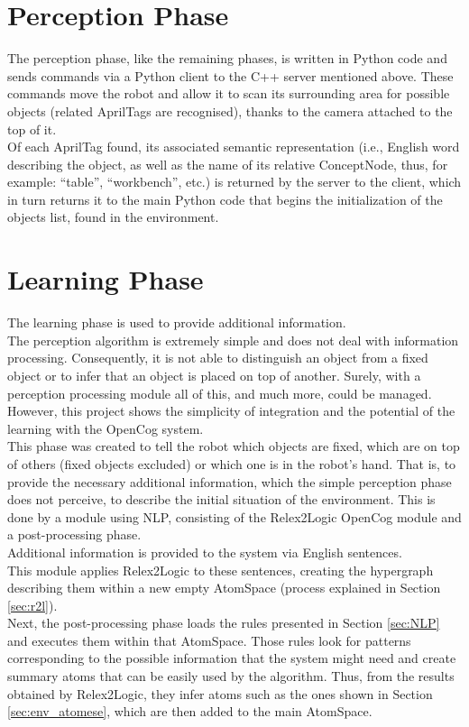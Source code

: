 \section{Perception Phase}\label{sec:perception}

The perception phase, like the remaining phases, is written in Python code and sends commands via a Python client to the C++ server mentioned above. These commands move the robot and allow it to scan its surrounding area for possible objects (related AprilTags are recognised), thanks to the camera attached to the top of it. \\
Of each AprilTag found, its associated semantic representation (i.e., English word describing the object, as well as the name of its relative ConceptNode, thus, for example: \enquote{table}, \enquote{workbench}, etc.) is returned by the server to the client, which in turn returns it to the main Python code that begins the initialization of the objects list, found in the environment.

\section{Learning Phase}\label{sec:learning}

The learning phase is used to provide additional information. \\
The perception algorithm is extremely simple and does not deal with information processing. Consequently, it is not able to distinguish an object from a fixed object or to infer that an object is placed on top of another. Surely, with a perception processing module all of this, and much more, could be managed. \\
However, this project shows the simplicity of integration and the potential of the learning with the OpenCog system. \\

This phase was created to tell the robot which objects are fixed, which are on top of others (fixed objects excluded) or which one is in the robot's hand. That is, to provide the necessary additional information, which the simple perception phase does not perceive, to describe the initial situation of the environment.
This is done by a module using NLP, consisting of the Relex2Logic OpenCog module and a post-processing phase. \\

Additional information is provided to the system via English sentences. \\
This module applies Relex2Logic to these sentences, creating the hypergraph describing them within a new empty AtomSpace (process explained in Section \ref{sec:r2l}).  \\
Next, the post-processing phase loads the rules presented in Section \ref{sec:NLP} and executes them within that AtomSpace. Those rules look for patterns corresponding to the possible information that the system might need and create summary atoms that can be easily used by the algorithm. Thus, from the results obtained by Relex2Logic, they infer atoms such as the ones shown in Section \ref{sec:env_atomese}, which are then added to the main AtomSpace. \\

